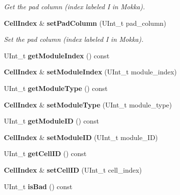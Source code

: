 \begin{DoxyCompactItemize}
\begin{DoxyCompactList}\small\item\em Get the pad column (index labeled I in Mokka). \item\end{DoxyCompactList}\item 
{\bf CellIndex} \& {\bf setPadColumn} (UInt\_\-t pad\_\-column)\label{classCALICE_1_1CellIndex_aa5e1d6c7bf39e5bfbf5ab414405b36d2}

\begin{DoxyCompactList}\small\item\em Set the pad column (index labeled I in Mokka). \item\end{DoxyCompactList}\item 
UInt\_\-t {\bfseries getModuleIndex} () const \label{classCALICE_1_1CellIndex_ad7c3aed04f51baa6a532e2dc18c0b985}

\item 
{\bf CellIndex} \& {\bfseries setModuleIndex} (UInt\_\-t module\_\-index)\label{classCALICE_1_1CellIndex_a87812ed0af0e2c688b21af5a7b3f53fd}

\item 
UInt\_\-t {\bfseries getModuleType} () const \label{classCALICE_1_1CellIndex_ada309da2021a56aa6bb61d0c503f2bd7}

\item 
{\bf CellIndex} \& {\bfseries setModuleType} (UInt\_\-t module\_\-type)\label{classCALICE_1_1CellIndex_aa7541e4208eb9cd7bb5401b324f539e1}

\item 
UInt\_\-t {\bfseries getModuleID} () const \label{classCALICE_1_1CellIndex_a77cabe65a4bd5887963f70eacef6a1b9}

\item 
{\bf CellIndex} \& {\bfseries setModuleID} (UInt\_\-t module\_\-ID)\label{classCALICE_1_1CellIndex_a5cfc410ec22f397a8c21c878e53ab311}

\item 
UInt\_\-t {\bfseries getCellID} () const \label{classCALICE_1_1CellIndex_a8754c16be2ec04e51661f388ff994ebf}

\item 
{\bf CellIndex} \& {\bfseries setCellID} (UInt\_\-t cell\_\-index)\label{classCALICE_1_1CellIndex_a3ecc39a5eb6b4c2d1319d113e1d8b6c3}

\item 
UInt\_\-t {\bfseries isBad} () const \label{classCALICE_1_1CellIndex_a33d6d5bfcc91c6653139a73b5c6ff207}


\end{DoxyCompactItemize}
